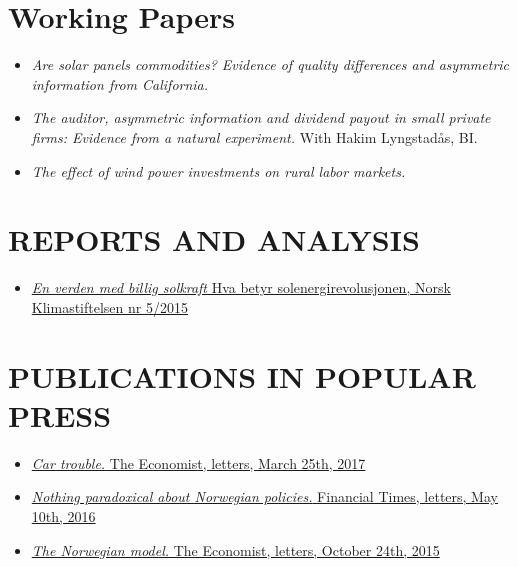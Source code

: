 \documentclass[margin]{res}
\begin{document}
\begin{resume}
\begin{itemize}
\end{itemize}


\normalsize{\section{Working Papers}}
\begin{itemize}
\setlength{\itemsep}{10pt}

\item[] \emph{Are solar panels commodities? Evidence of quality differences and asymmetric information from California.}
\item[] \emph{The auditor, asymmetric information and dividend payout in small private firms: Evidence from a natural experiment.} With Hakim Lyngstadås, BI.
\item[] \emph{The effect of wind power investments on rural labor markets.}

\end{itemize}

\section{REPORTS AND ANALYSIS}
\begin{itemize}
\setlength{\itemsep}{5pt}
\item[] \href{http://klimastiftelsen.no/wp-content/uploads/2015/06/NK5_2015_Solenergirevolusjonen.pdf}{\emph{En verden med billig solkraft} Hva betyr solenergirevolusjonen, Norsk Klimastiftelsen nr 5/2015}
\end{itemize}

\section{PUBLICATIONS IN POPULAR PRESS}
\begin{itemize}
\setlength{\itemsep}{5pt}

\item[] \href{https://www.economist.com/news/letters/21719426-liberia-charles-murray-france-turkey-electric-cars-dead-words-letters-editor}{\emph{Car trouble.} The Economist, letters, March 25th, 2017}

\item[] \href{https://next.ft.com/content/a9ca4ad4-15d8-11e6-9d98-00386a18e39d}{\emph{Nothing paradoxical about Norwegian policies.} Financial Times, letters, May 10th, 2016}

\item[] \href{http://www.economist.com/news/letters/21676738-letters}{\emph{The Norwegian model.} The Economist, letters, October 24th, 2015}


\end{itemize}
\end{resume}
\end{document}
